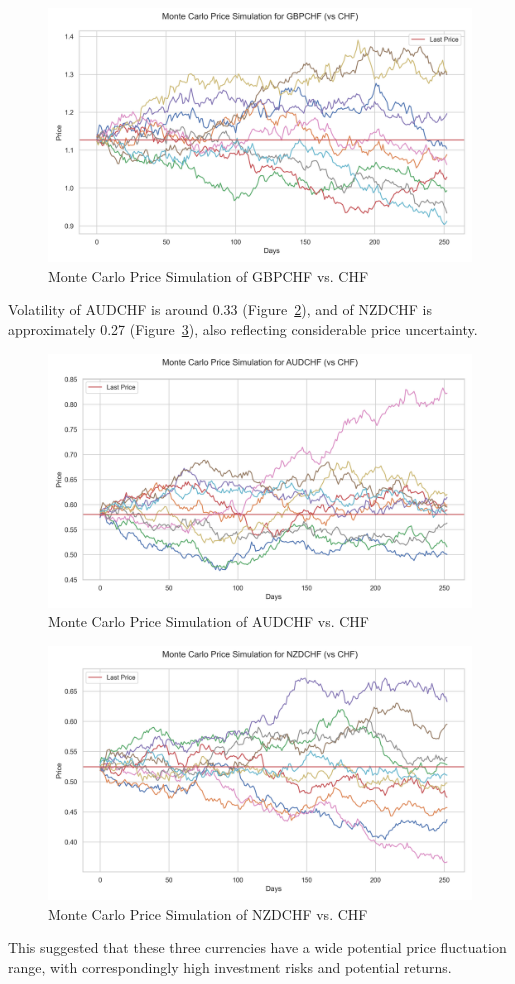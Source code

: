\documentclass{article}
\begin{document}
\begin{figure}[H]
    \centering  \includegraphics[width=0.75\linewidth]{reports/figures/monte_carlo_price_simulation_GBPCHF_vs_CHF.png}
    \caption{Monte Carlo Price Simulation of GBPCHF vs. CHF}  \label{fig:monte_carlo_price_simulation_GBPCHF_vs_CHF}
\end{figure}

Volatility of AUDCHF is around 0.33 (Figure~\ref{fig:monte_carlo_price_simulation_AUDCHF_vs_CHF}), and of NZDCHF is approximately 0.27 (Figure~\ref{fig:monte_carlo_price_simulation_NZDCHF_vs_CHF}), also reflecting considerable price uncertainty. 

\begin{figure}[H]
    \centering \includegraphics[width=0.75\linewidth]{reports/figures/monte_carlo_price_simulation_AUDCHF_vs_CHF.png}
    \caption{Monte Carlo Price Simulation of AUDCHF vs. CHF} \label{fig:monte_carlo_price_simulation_AUDCHF_vs_CHF}
\end{figure}

\begin{figure}[H]
    \centering  \includegraphics[width=0.75\linewidth]{reports/figures/monte_carlo_price_simulation_NZDCHF_vs_CHF.png}
    \caption{Monte Carlo Price Simulation of NZDCHF vs. CHF} \label{fig:monte_carlo_price_simulation_NZDCHF_vs_CHF}
\end{figure}
This suggested that these three currencies have a wide potential price fluctuation range, with correspondingly high investment risks and potential returns.
\end{document}
